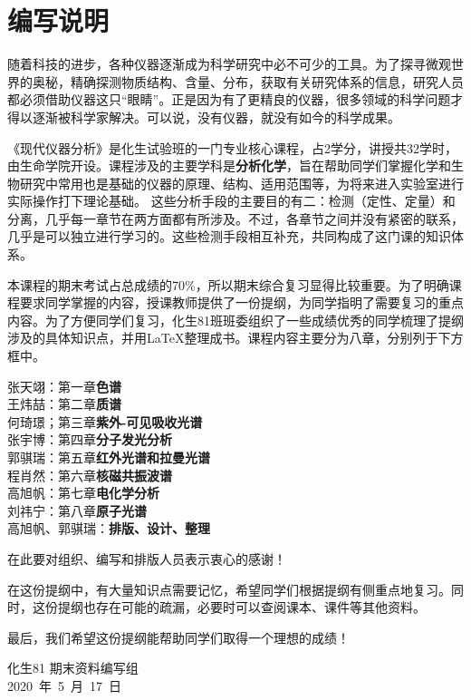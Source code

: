 \chapter*{编写说明}

随着科技的进步，各种仪器逐渐成为科学研究中必不可少的工具。为了探寻微观世界的奥秘，精确探测物质结构、含量、分布，获取有关研究体系的信息，研究人员都必须借助仪器这只“眼睛”。正是因为有了更精良的仪器，很多领域的科学问题才得以逐渐被科学家解决。可以说，没有仪器，就没有如今的科学成果。

《现代仪器分析》是化生试验班的一门专业核心课程，占2学分，讲授共32学时，由生命学院开设。课程涉及的主要学科是\textbf{分析化学}，旨在帮助同学们掌握化学和生物研究中常用也是基础的仪器的原理、结构、适用范围等，为将来进入实验室进行实际操作打下理论基础。
这些分析手段的主要目的有二：检测（定性、定量）和分离，几乎每一章节在两方面都有所涉及。不过，各章节之间并没有紧密的联系，几乎是可以独立进行学习的。这些检测手段相互补充，共同构成了这门课的知识体系。

本课程的期末考试占总成绩的70\%，所以期末综合复习显得比较重要。为了明确课程要求同学掌握的内容，授课教师提供了一份提纲，为同学指明了需要复习的重点内容。为了方便同学们复习，化生81班班委组织了一些成绩优秀的同学梳理了提纲涉及的具体知识点，并用\LaTeX 整理成书。课程内容主要分为八章，分别列于下方框中。
\begin{tcolorbox}[title={\bfseries 编写组成员}]
	 张天翊：第一章\hspace{1em}\textbf{色谱}\\
	 王炜喆：第二章\hspace{1em}\textbf{质谱}\\
	 何琦璟；第三章\hspace{1em}\textbf{紫外-可见吸收光谱}\\
	 张宇博：第四章\hspace{1em}\textbf{分子发光分析}\\
	 郭骐瑞：第五章\hspace{1em}\textbf{红外光谱和拉曼光谱}\\
	 程肖然：第六章\hspace{1em}\textbf{核磁共振波谱}\\
	 高旭帆：第七章\hspace{1em}\textbf{电化学分析}\\
	 刘祎宁：第八章\hspace{1em}\textbf{原子光谱}\\
	 高旭帆、郭骐瑞：\textbf{排版、设计、整理}
\end{tcolorbox}
在此要对组织、编写和排版人员表示衷心的感谢！

在这份提纲中，有大量知识点需要记忆，希望同学们根据提纲有侧重点地复习。同时，这份提纲也存在可能的疏漏，必要时可以查阅课本、课件等其他资料。

最后，我们希望这份提纲能帮助同学们取得一个理想的成绩！

\vskip 1.5cm

\begin{flushright}
	化生81 期末资料编写组\\
	2020\ 年\ 5\ 月\ 17\ 日
\end{flushright}